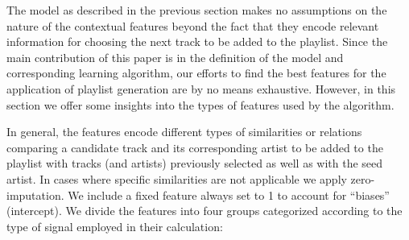 The model as described in the previous section makes no assumptions on the nature of the contextual features beyond the fact that they encode relevant information for choosing the next track to be added to the playlist.  
Since the main contribution of this paper is in the definition of the model and corresponding learning algorithm, our efforts to find the best features for the application of playlist generation are by no means exhaustive. 
However, in this section we offer some insights into the types of features used by the algorithm.


In general, the features encode different types of similarities or relations  comparing a candidate track and its corresponding artist to be added to the playlist with tracks (and artists) previously selected as well as with the seed artist. In cases where specific similarities are not applicable we apply zero-imputation.
We include a fixed feature always set to 1 to account for ``biases'' (intercept). 
We divide the features into four groups categorized according to the type of signal employed in their calculation:


